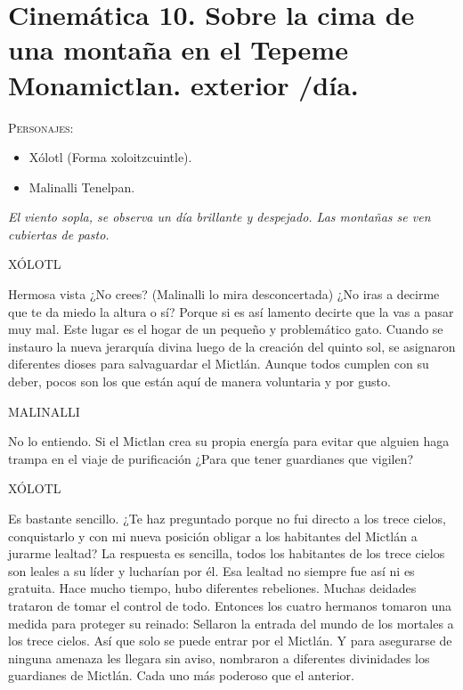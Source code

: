 \documentclass[11pt,letterpaper]{article}
\begin{document}
\section{Cinemática 10. Sobre la cima de una montaña en el Tepeme Monamictlan. exterior /día.}
 \textsc{Personajes}:
 \begin{itemize}
 \item Xólotl (Forma xoloitzcuintle).
	\item Malinalli Tenelpan.
 \end{itemize}
\textit{El viento sopla, se observa un día brillante y despejado.  Las montañas se ven cubiertas de pasto.}

\begin{center}
XÓLOTL
\\
\par
Hermosa vista ¿No crees? (Malinalli lo mira desconcertada) ¿No iras a decirme que te da miedo la altura o sí? Porque si es así lamento decirte que la vas a pasar muy mal. Este lugar es el hogar de un pequeño y problemático gato. Cuando se instauro la nueva jerarquía divina luego de la creación del quinto sol, se asignaron diferentes dioses para salvaguardar el Mictlán. Aunque todos cumplen con su deber, pocos son los que están aquí de manera voluntaria y por gusto.
\\
\par
MALINALLI
\\
\par
No lo entiendo. Si el Mictlan crea su propia energía para evitar que alguien haga trampa en el viaje de purificación ¿Para que tener guardianes que vigilen?
\\
\par
XÓLOTL
\\
\par
Es bastante sencillo. ¿Te haz preguntado porque no fui directo a los trece cielos, conquistarlo y con mi nueva posición obligar a los habitantes del Mictlán a jurarme lealtad? La respuesta es sencilla, todos los habitantes de los trece cielos son leales a su líder y lucharían por él. Esa lealtad no siempre fue así ni es gratuita. Hace mucho tiempo, hubo diferentes rebeliones. Muchas deidades trataron de tomar el control de todo. Entonces los cuatro hermanos tomaron una medida para proteger su reinado: Sellaron la entrada del mundo de los mortales a los trece cielos. Así que solo se puede entrar por el Mictlán. Y para asegurarse de ninguna amenaza les llegara sin aviso, nombraron a diferentes divinidades los guardianes de Mictlán. Cada uno más poderoso que el anterior. 

\end{center}
\end{document}
